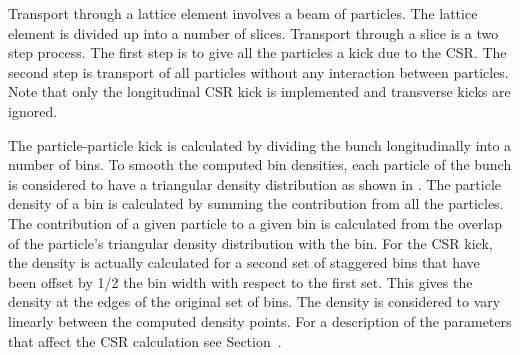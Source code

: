 Transport through a lattice element involves a beam of particles. The
lattice element is divided up into a number of slices. Transport
through a slice is a two step process.  The first step is to give all
the particles a kick due to the CSR. The second step is transport of
all particles without any interaction between particles. Note that
only the longitudinal CSR kick is implemented and transverse kicks are
ignored.

The particle-particle kick is calculated by dividing the bunch
longitudinally into a number of bins. To smooth the computed bin
densities, each particle of the bunch is considered to have a
triangular density distribution as shown in .
The particle density of a bin is calculated by summing the
contribution from all the particles. The contribution of a given
particle to a given bin is calculated from the overlap of the
particle's triangular density distribution with the bin. For the CSR
kick, the density is actually calculated for a second set of staggered
bins that have been offset by 1/2 the bin width with respect to the
first set. This gives the density at the edges of the original set of
bins. The density is considered to vary linearly between the computed
density points. For a description of the parameters that affect the
CSR calculation see Section~.
 
%
